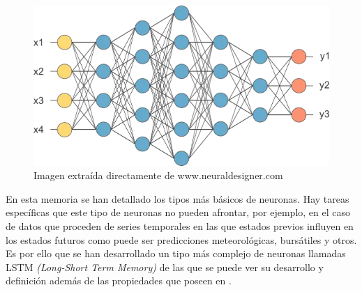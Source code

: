 \begin{figure}[ht]
\centering
\includegraphics[scale=0.35]{Documentos Extra/Imagenes/red-neuronal-grande.png}
\caption{Imagen extraída directamente de www.neuraldesigner.com}
\label{fig:estructura red neuronal}
\end{figure}


\noindent En esta memoria se han detallado los tipos más básicos de neuronas. Hay tareas específicas que este tipo de neuronas no pueden afrontar, por ejemplo, en el caso de datos que proceden de series temporales en las que estados previos influyen en los estados futuros como puede ser predicciones meteorológicas, bursátiles y otros. Es por ello que  se han desarrollado un tipo más complejo de neuronas llamadas LSTM \emph{(Long-Short Term Memory)} de las que se puede ver su desarrollo y definición además de las propiedades que poseen en \cite{Hochreiter 1997,Neural Designer}.

